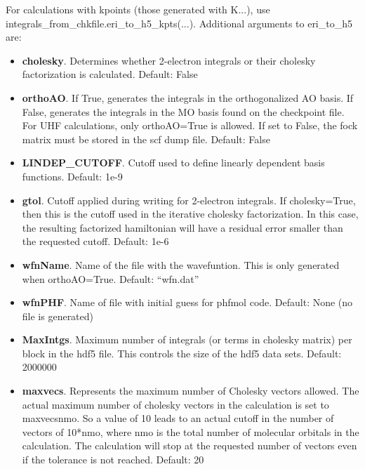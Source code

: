 For calculations with kpoints (those generated with K...), use integrals\_from\_chkfile.eri\_to\_h5\_kpts(...).
Additional arguments to eri\_to\_h5 are:

\begin{itemize}
\item \textbf{cholesky}. Determines whether 2-electron integrals or their cholesky factorization is calculated.
  Default: False
\item \textbf{orthoAO}. If True, generates the integrals in the orthogonalized AO basis. If False, generates the integrals in the MO basis found on the checkpoint file. For UHF calculations, only orthoAO=True is allowed. If set to False, the fock matrix must be stored in the scf dump file.
  Default: False
\item \textbf{LINDEP\_CUTOFF}.  Cutoff used to define linearly dependent basis functions.
  Default: 1e-9
\item \textbf{gtol}. Cutoff applied during writing for 2-electron integrals. If cholesky=True, then this is the cutoff used in the iterative cholesky factorization. In this case, the resulting factorized hamiltonian will have a residual error smaller than the requested cutoff.
  Default: 1e-6
\item \textbf{wfnName}. Name of the file with the wavefuntion. This is only generated  when orthoAO=True.
  Default: ``wfn.dat''
\item \textbf{wfnPHF}. Name of file with initial guess for phfmol code.
  Default: None (no file is generated)
\item \textbf{MaxIntgs}. Maximum number of integrals  (or terms in cholesky matrix) per block in the hdf5 file. This controls the size of the hdf5 data sets.
  Default: 2000000
\item \textbf{maxvecs}. Represents the maximum number of Cholesky vectors allowed. The actual maximum number of cholesky vectors in the calculation is set to maxvecsnmo. So a value of 10 leads to an actual cutoff in the number of vectors of 10*nmo, where nmo is the total number of molecular orbitals in the calculation. The calculation will stop at the requested number of vectors even if the tolerance is not reached.
  Default: 20
\end{itemize}
